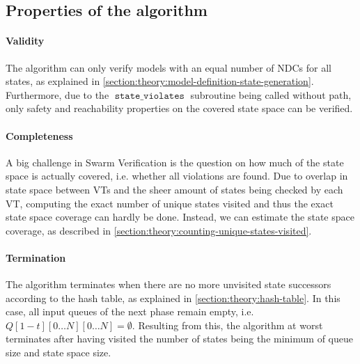 \documentclass[
fancyheadings, %
%
%
]{stsreprt}
\DeclareMathOperator{\sViolates}{\texttt{state\_violates}}
\begin{document}

\subsection{Properties of the algorithm}
\label{section:theory:grapple-properties}

\paragraph{Validity}
The algorithm can only verify models with an equal number of NDCs for all states, as explained in \cref{section:theory:model-definition-state-generation}.
Furthermore, due to the $\sViolates$ subroutine being called without path, only safety and reachability properties on the covered state space can be verified.


\paragraph{Completeness}
A big challenge in Swarm Verification is the question on how much of the state space is actually covered, i.e. whether all violations are found.
Due to overlap in state space between VTs and the sheer amount of states being checked by each VT, computing the exact number of unique states visited and thus the exact state space coverage can hardly be done.
Instead, we can estimate the state space coverage, as described in \cref{section:theory:counting-unique-states-visited}.

\paragraph{Termination}
The algorithm terminates when there are no more unvisited state successors according to the hash table, as explained in \cref{section:theory:hash-table}.
In this case, all input queues of the next phase remain empty, i.e. $Q\left[1 - t\right]\left[0 \dots N\right]\left[0 \dots N\right] = \emptyset$.
Resulting from this, the algorithm at worst terminates after having visited the number of states being the minimum of queue size and state space size.
\end{document}
